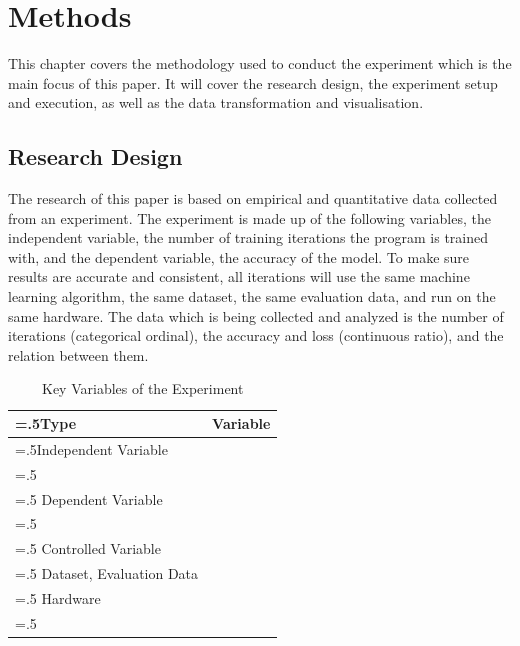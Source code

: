 \section{Methods}
This chapter covers the methodology used to conduct the experiment which is the main focus of this paper.
It will cover the research design, the experiment setup and execution, as well as the data transformation 
and visualisation.\\

\subsection{Research Design}
The research of this paper is based on empirical and quantitative data collected from an experiment.
The experiment is made up of the following variables, the independent variable, the number of training iterations the
program is trained with, and the dependent variable, the accuracy of the model. To make sure results are accurate and consistent, 
all iterations will use the same machine learning algorithm,
the same dataset, the same evaluation data, and run on the same hardware.
The data which is being collected and analyzed is the number of iterations (categorical ordinal), the accuracy
and loss (continuous ratio), and the relation between them.\\

\begin{table}[h]
\centering
\begin{tabularx}{\textwidth}{|>{\hsize=.5\hsize}X|>{\hsize=1.5\hsize}X|}
\hline
\textbf{Type} & \textbf{Variable} \\
\hline
Independent Variable & 
\begin{tabular}{@{}l@{}}
\textbullet{} Number of Iterations  \\
\end{tabular} 
\\
\hline
Dependent Variable & 
\begin{tabular}{@{}l@{}}
\textbullet{} Accuracy of the Model\\
\end{tabular} 
\\
\hline
Controlled Variable & 
\begin{tabular}{@{}l@{}}
\textbullet{} Machine Learning Algorithm \\
\textbullet{} Dataset, Evaluation Data \\
\textbullet{} Hardware \\
\end{tabular} 
\\
\hline
\end{tabularx}
\caption{Key Variables of the Experiment}
\label{table:1}
\end{table}


